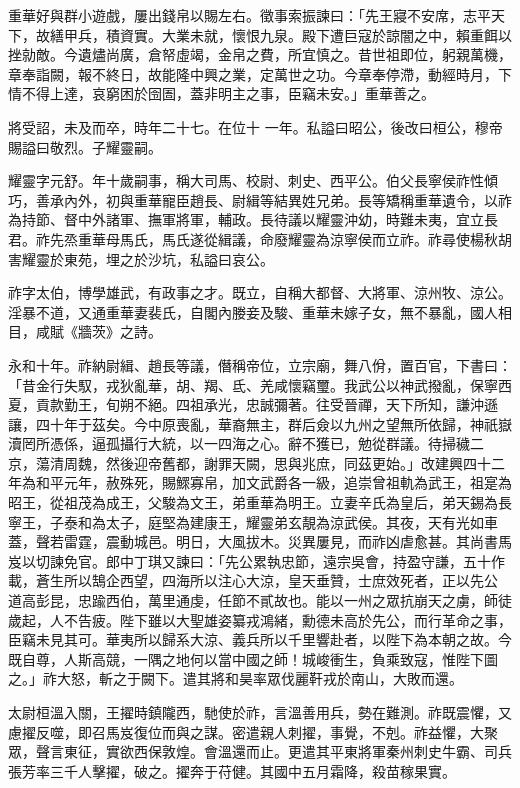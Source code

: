 \begin{pinyinscope}
 重華好與群小遊戲，屢出錢帛以賜左右。徵事索振諫曰：「先王寢不安席，志平天下，故繕甲兵，積資實。大業未就，懷恨九泉。殿下遭巨寇於諒闇之中，賴重餌以挫勍敵。今遺燼尚廣，倉帑虛竭，金帛之費，所宜慎之。昔世祖即位，躬親萬機，章奉詣闕，報不終日，故能隆中興之業，定萬世之功。今章奉停滯，動經時月，下情不得上達，哀窮困於囹圄，蓋非明主之事，臣竊未安。」重華善之。



 將受詔，未及而卒，時年二十七。在位十
 一年。私謚曰昭公，後改曰桓公，穆帝賜謚曰敬烈。子耀靈嗣。



 耀靈字元舒。年十歲嗣事，稱大司馬、校尉、刺史、西平公。伯父長寧侯祚性傾巧，善承內外，初與重華寵臣趙長、尉緝等結異姓兄弟。長等矯稱重華遺令，以祚為持節、督中外諸軍、撫軍將軍，輔政。長待議以耀靈沖幼，時難未夷，宜立長君。祚先烝重華母馬氏，馬氏遂從緝議，命廢耀靈為涼寧侯而立祚。祚尋使楊秋胡害耀靈於東苑，埋之於沙坑，私謚曰哀公。



 祚字太伯，博學雄武，有政事之才。既立，自稱大都督、大將軍、涼州牧、涼公。淫暴不道，又通重華妻裴氏，自閣內媵妾及駿、重華未嫁子女，無不暴亂，國人相目，咸賦《牆茨》之詩。



 永和十年。祚納尉緝、趙長等議，僭稱帝位，立宗廟，舞八佾，置百官，下書曰：「昔金行失馭，戎狄亂華，胡、羯、氐、羌咸懷竊璽。我武公以神武撥亂，保寧西夏，貢款勤王，旬朔不絕。四祖承光，忠誠彌著。往受晉禪，天下所知，謙沖遜讓，四十年于茲矣。今中原喪亂，華裔無主，群后僉以九州之望無所依歸，神祇嶽瀆罔所憑係，逼孤攝行大統，以一四海之心。辭不獲已，勉從群議。待掃穢二
 京，蕩清周魏，然後迎帝舊都，謝罪天闕，思與兆庶，同茲更始。」改建興四十二年為和平元年，赦殊死，賜鰥寡帛，加文武爵各一級，追崇曾祖軌為武王，祖寔為昭王，從祖茂為成王，父駿為文王，弟重華為明王。立妻辛氏為皇后，弟天錫為長寧王，子泰和為太子，庭堅為建康王，耀靈弟玄靚為涼武侯。其夜，天有光如車蓋，聲若雷霆，震動城邑。明日，大風拔木。災異屢見，而祚凶虐愈甚。其尚書馬岌以切諫免官。郎中丁琪又諫曰：「先公累執忠節，遠宗吳會，持盈守謙，五十作載，蒼生所以鵠企西望，四海所以注心大涼，皇天垂贊，士庶效死者，正以先公
 道高彭昆，忠踰西伯，萬里通虔，任節不貳故也。能以一州之眾抗崩天之虜，師徒歲起，人不告疲。陛下雖以大聖雄姿纂戎鴻緒，勳德未高於先公，而行革命之事，臣竊未見其可。華夷所以歸系大涼、義兵所以千里響赴者，以陛下為本朝之故。今既自尊，人斯高競，一隅之地何以當中國之師！城峻衝生，負乘致寇，惟陛下圖之。」祚大怒，斬之于闕下。遣其將和昊率眾伐麗靬戎於南山，大敗而還。



 太尉桓溫入關，王擢時鎮隴西，馳使於祚，言溫善用兵，勢在難測。祚既震懼，又慮擢反噬，即召馬岌復位而與之謀。密遣親人刺擢，事覺，不剋。祚益懼，大聚
 眾，聲言東征，實欲西保敦煌。會溫還而止。更遣其平東將軍秦州刺史牛霸、司兵張芳率三千人擊擢，破之。擢奔于苻健。其國中五月霜降，殺苗稼果實。




\end{pinyinscope}
